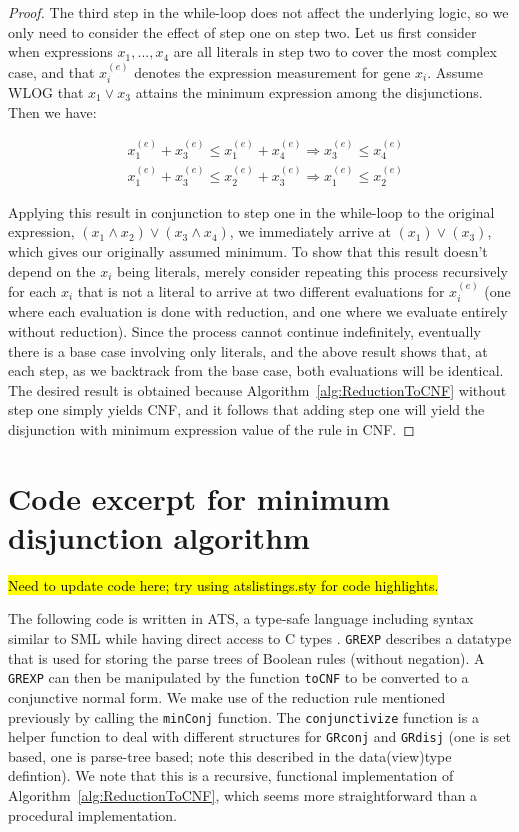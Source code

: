 \begin{proof}
The third step in the while-loop does not affect the
underlying logic, so we only need to consider the effect of step one
on step two.  Let us first consider when expressions $x_1, ..., x_4$
are all literals in step two to cover the most complex case, and that
$x_i^{(e)}$ denotes the expression measurement for gene $x_i$. Assume
WLOG that $x_1 \lor x_3$ attains the minimum expression among the
disjunctions. Then we have:

\begin{align*}
&x_{1}^{(e)} + x_{3}^{(e)} \leq x_{1}^{(e)} + x_{4}^{(e)} \Rightarrow x_{3}^{(e)} \leq x_{4}^{(e)} \\
&x_{1}^{(e)} + x_{3}^{(e)} \leq x_{2}^{(e)} + x_{3}^{(e)} \Rightarrow x_{1}^{(e)} \leq x_{2}^{(e)} 
\end{align*}

Applying this result in conjunction to step one in the while-loop to
the original expression, $(x_1 \land x_2) \lor (x_3 \land x_4)$, we
immediately arrive at $(x_1) \lor (x_3)$, which gives our originally
assumed minimum. To show that this result doesn't depend on the $x_i$
being literals, merely consider repeating this process recursively for
each $x_i$ that is not a literal to arrive at two different
evaluations for $x_i^{(e)}$ (one where each evaluation is done with
reduction, and one where we evaluate entirely without reduction).
Since the process cannot continue indefinitely, eventually there is a
base case involving only literals, and the above result shows that, at
each step, as we backtrack from the base case, both evaluations will
be identical. The desired result is obtained because
Algorithm~\ref{alg:ReductionToCNF} without step one simply yields CNF,
and it follows that adding step one will yield the disjunction with
minimum expression value of the rule in CNF.
\end{proof}

\section{Code excerpt for minimum disjunction algorithm}
\label{sec:code}

\hl{Need to update code here; try using atslistings.sty for code 
highlights.}

The following code is written in ATS, a type-safe language including
syntax similar to SML while having direct access to C types
\citep{ATStypes03}. \texttt{GREXP} describes a datatype that is used
for storing the parse trees of Boolean rules (without negation).  A
\texttt{GREXP} can then be manipulated by the function \texttt{toCNF}
to be converted to a conjunctive normal form. We make use of the
reduction rule mentioned previously by calling the \texttt{minConj}
function. The \texttt{conjunctivize} function is a helper function to
deal with different structures for \texttt{GRconj} and \texttt{GRdisj}
(one is set based, one is parse-tree based; note this described in the
data(view)type defintion). We note that this is a recursive,
functional implementation of Algorithm~\ref{alg:ReductionToCNF}, which
seems more straightforward than a procedural implementation.

